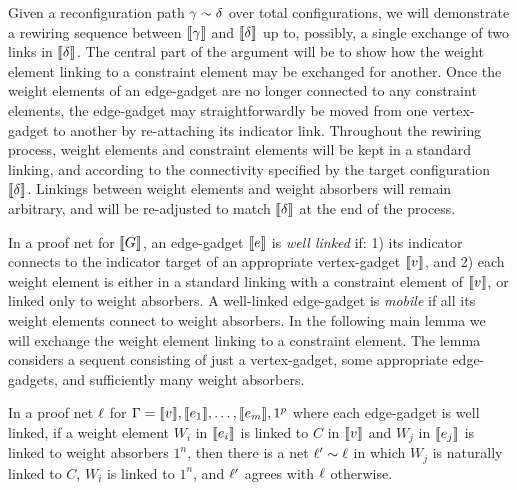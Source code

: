 \documentclass{sigplanconf}
\let\aftersubsection=\noindent
\begin{document}
\aftersubsection
Given a reconfiguration path $\gamma\perm\delta$ over total configurations, we will demonstrate a rewiring sequence between $\llbracket\gamma\rrbracket$ and $\llbracket\delta\rrbracket$ up to, possibly, a single exchange of two links in $\llbracket\delta\rrbracket$.
%
The central part of the argument will be to show how the weight element linking to a constraint element may be exchanged for another.
%
Once the weight elements of an edge-gadget are no longer connected to any constraint elements, the edge-gadget may straightforwardly be moved from one vertex-gadget to another by re-attaching its indicator link.
%
Throughout the rewiring process, weight elements and constraint elements will be kept in a standard linking, and according to the connectivity specified by the target configuration $\llbracket\delta\rrbracket$.
%
Linkings between weight elements and weight absorbers will remain arbitrary, and will be re-adjusted to match $\llbracket\delta\rrbracket$ at the end of the process.



In a proof net for $\llbracket G\rrbracket$, an edge-gadget $\llbracket e\rrbracket$ is \emph{well linked} if: 1) its indicator connects to the indicator target of an appropriate vertex-gadget $\llbracket v\rrbracket$, and 2) each weight element is either in a standard linking with a constraint element of $\llbracket v\rrbracket$, or linked only to weight absorbers.
%
A well-linked edge-gadget is \emph{mobile} if all its weight elements connect to weight absorbers.
%
In the following main lemma we will exchange the weight element linking to a constraint element.
%
The lemma considers a sequent consisting of just a vertex-gadget, some appropriate edge-gadgets, and sufficiently many weight absorbers.


\begin{lemma}
\label{lem:octopus roll}
In a proof net $\ell$ for $\Gamma=\llbracket v\rrbracket,\llbracket e_1\rrbracket,\dotsc,\llbracket e_m\rrbracket,1^p$ where each edge-gadget is well linked, if a weight element $W_i$ in $\llbracket e_i\rrbracket$ is linked to $C$ in $\llbracket v\rrbracket$ and $W_j$ in $\llbracket e_j\rrbracket$ is linked to weight absorbers $1^n$, then there is a net $\links'\perm\links$ in which $W_j$ is naturally linked to $C$, $W_i$ is linked to $1^n$, and $\ell'$ agrees with $\ell$ otherwise.
\end{lemma}


\renewcommand\scalefactor{0.88}

\newcommand\displayOcto[1]{%
 \NoIndent{%
   \smallskip%
   \centerline{%
	 \scale{#1}%
  }}%
  \bigskip%
}
\end{document}
